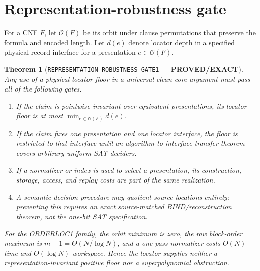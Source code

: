 \documentclass[11pt]{article}
\newtheorem{theorem}{Theorem}
\newcommand{\EXACT}{\textbf{PROVED/EXACT}}
\begin{document}
\section{Representation-robustness gate}

For a CNF $F$, let $\mathcal O(F)$ be its orbit under clause permutations
that preserve the formula and encoded length.  Let $d(e)$ denote locator depth
in a specified physical-record interface for a presentation $e\in\mathcal
O(F)$.

\begin{theorem}[\texttt{REPRESENTATION-ROBUSTNESS-GATE1} --- \EXACT]
Any use of a physical locator floor in a universal clean-core argument must
pass all of the following gates.
\begin{enumerate}[leftmargin=1.7em]
\item If the claim is pointwise invariant over equivalent presentations, its
locator floor is at most $\min_{e\in\mathcal O(F)}d(e)$.
\item If the claim fixes one presentation and one locator interface, the
floor is restricted to that interface until an algorithm-to-interface
transfer theorem covers arbitrary uniform SAT deciders.
\item If a normalizer or index is used to select a presentation, its
construction, storage, access, and replay costs are part of the same
realization.
\item A semantic decision procedure may quotient source locations entirely;
preventing this requires an exact source-matched BIND/reconstruction theorem,
not the one-bit SAT specification.
\end{enumerate}
For the ORDERLOC1 family, the orbit minimum is zero, the raw block-order
maximum is $m-1=\Theta(N/\log N)$, and a one-pass normalizer costs $O(N)$
time and $O(\log N)$ workspace.  Hence the locator supplies neither a
representation-invariant positive floor nor a superpolynomial obstruction.
\end{theorem}
\end{document}

